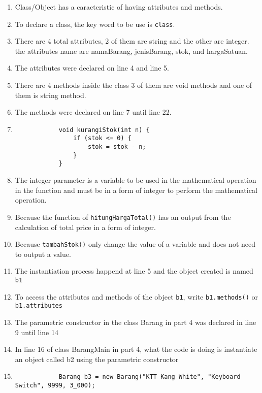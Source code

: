 \documentclass[12pt,titlepage]{article}
\begin{document}
\begin{enumerate}
    \item {
        Class/Object has a caracteristic of having attributes and methods.
    }
    \item {
        To declare a class, the key word to be use is \texttt{class}.
    }
    \item {
        There are 4 total attributes, 2 of them are string and the other are integer. the attributes name are namaBarang, jenisBarang, stok, and hargaSatuan.
    }
    \item {
        The attributes were declared on line 4 and line 5.
    }
    \item {
        There are 4 methods inside the class 3 of them are void methods and one of them is string method.
    }
    \item {
        The methods were declared on line 7 until line 22.
    }
    \item {
        \begin{verbatim}
            void kurangiStok(int n) {
                if (stok <= 0) {
                    stok = stok - n;
                }
            }
        \end{verbatim}
    }
    \item {
        The integer parameter is a variable to be used in the mathematical operation in the function and must be in a form of integer to perform the mathematical operation.
    }
    \item {
        Because the function of \texttt{hitungHargaTotal()} has an output from the calculation of total price in a form of integer.
    }
    \item {
        Because \texttt{tambahStok()} only change the value of a variable and does not need to output a value.
    }
    \item {
        The instantiation process happend at line 5 and the object created is named \texttt{b1}
    }
    \item {
        To access the attributes and methods of the object \texttt{b1}, write \texttt{b1.methods()} or \texttt{b1.attributes}
    }
    \item {
        The parametric constructor in the class Barang in part 4 was declared in line 9 until line 14
    }
    \item {
        In line 16 of class BarangMain in part 4, what the code is doing is instantiate an object called b2 using the parametric constructor
    }
    \item {
        \begin{verbatim}
            Barang b3 = new Barang("KTT Kang White", "Keyboard Switch", 9999, 3_000);
        \end{verbatim}
    }
\end{enumerate}
\end{document}

